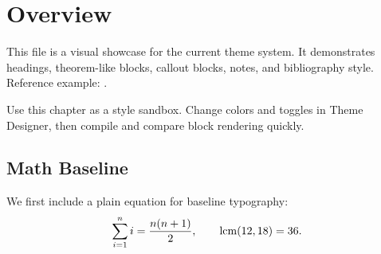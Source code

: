 \documentclass[../01-overview.tex]{subfiles}
\begin{document}
\section{Overview}

This file is a visual showcase for the current theme system.
It demonstrates headings, theorem-like blocks, callout blocks, notes, and bibliography style.
Reference example: \cite{Eg}.

\begin{note}
Use this chapter as a style sandbox.
Change colors and toggles in Theme Designer, then compile and compare block rendering quickly.
\end{note}

\subsection{Math Baseline}

We first include a plain equation for baseline typography:
\[
    \sum_{i=1}^{n} i = \frac{n(n+1)}{2}, \qquad
    \operatorname{lcm}(12, 18) = 36.
\]
\end{document}
